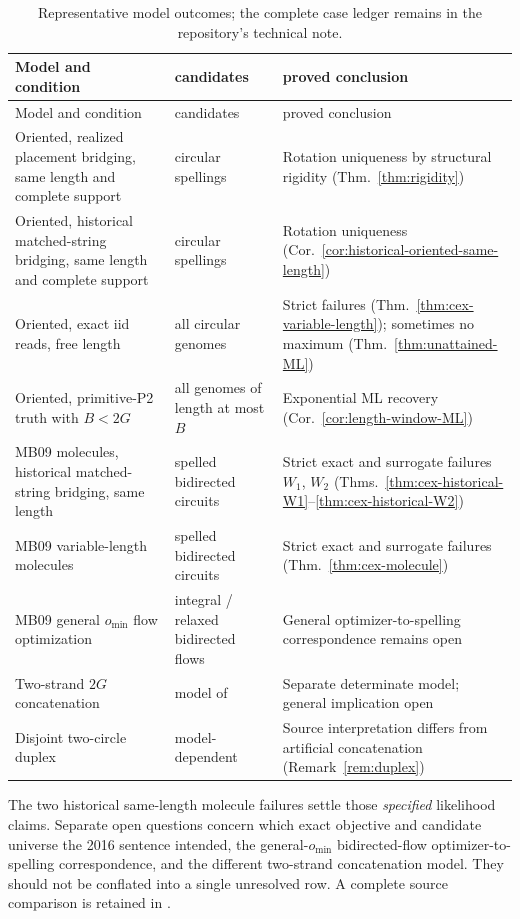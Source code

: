 \begin{longtable}{@{}p{}p{}p{}@{}}
\caption{Representative model outcomes; the complete case ledger
remains in the repository's technical note.}
\label{tab:finite}\\
\toprule
Model and condition & candidates & proved conclusion\\
\midrule
\endfirsthead
\toprule Model and condition & candidates & proved conclusion\\
\midrule\endhead
\bottomrule\endlastfoot
Oriented, realized placement bridging, same length and complete support
& circular spellings
& Rotation uniqueness by structural rigidity
(Thm.~\ref{thm:rigidity})\\
Oriented, historical matched-string bridging, same length and complete support
& circular spellings
& Rotation uniqueness (Cor.~\ref{cor:historical-oriented-same-length})\\
Oriented, exact iid reads, free length
& all circular genomes
& Strict failures (Thm.~\ref{thm:cex-variable-length});
sometimes no maximum (Thm.~\ref{thm:unattained-ML})\\
Oriented, primitive-P2 truth with $B<2G$
& all genomes of length at most $B$
& Exponential ML recovery
(Cor.~\ref{cor:length-window-ML})\\
MB09 molecules, historical matched-string bridging, same length
& spelled bidirected circuits
& Strict exact and surrogate failures $W_1$, $W_2$
(Thms.~\ref{thm:cex-historical-W1}--\ref{thm:cex-historical-W2})\\
MB09 variable-length molecules
& spelled bidirected circuits
& Strict exact and surrogate failures (Thm.~\ref{thm:cex-molecule})\\
MB09 general $o_{\min}$ flow optimization
& integral / relaxed bidirected flows
& General optimizer-to-spelling correspondence remains open\\
Two-strand $2G$ concatenation
& model of \textcite{bresler2013}
& Separate determinate model; general implication open\\
Disjoint two-circle duplex
& model-dependent
& Source interpretation differs from artificial concatenation
(Remark~\ref{rem:duplex})\\
\end{longtable}

The two historical same-length molecule failures settle those
\emph{specified} likelihood claims. Separate open questions
concern which exact objective and candidate universe the 2016
sentence intended, the general-$o_{\min}$ bidirected-flow
optimizer-to-spelling correspondence, and the different
two-strand concatenation model. They should not be conflated
into a single unresolved row. A complete source comparison
is retained in
.

